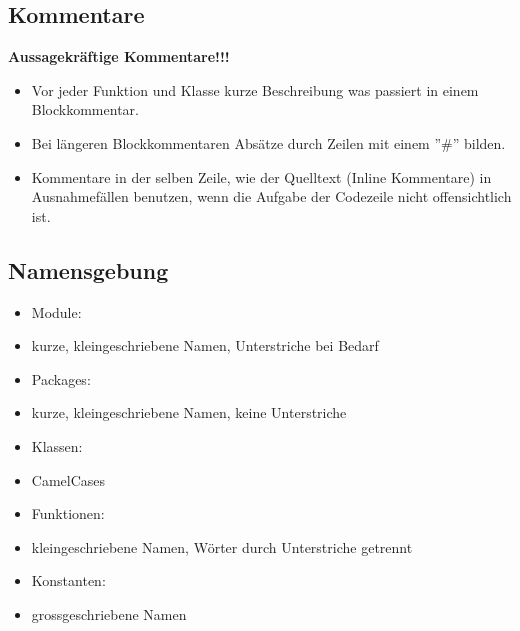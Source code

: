 \documentclass[11pt]{scrartcl}
\begin{document}
		\subsection{Kommentare}
			\textbf{Aussagekr\"aftige Kommentare!!!}
			\begin{itemize}
				\item[] Vor jeder Funktion und Klasse kurze Beschreibung was passiert in einem Blockkommentar.
				\item[] Bei l\"angeren Blockkommentaren Abs\"atze durch Zeilen mit einem ''\#'' bilden.
				\item[] Kommentare in der selben Zeile, wie der Quelltext (Inline Kommentare) in Ausnahmef\"allen benutzen, wenn die Aufgabe der Codezeile nicht offensichtlich ist.
			\end{itemize}
		\subsection{Namensgebung}
			\begin{itemize}
				\item Module:
				\item[] kurze, kleingeschriebene Namen, Unterstriche bei Bedarf
				\item Packages:
				\item[] kurze, kleingeschriebene Namen, keine Unterstriche
				\item Klassen:
				\item[] CamelCases
				\item Funktionen:
				\item[] kleingeschriebene Namen, W\"orter durch Unterstriche getrennt
				\item Konstanten:
				\item[] grossgeschriebene Namen
			\end{itemize}
\end{document}
